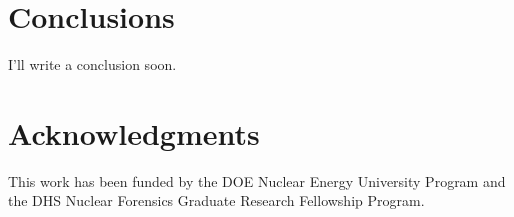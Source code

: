 \documentclass{anstrans}
\begin{document}
\section{Conclusions}

I'll write a conclusion soon. 

\section{Acknowledgments}
This work has been funded by the \gls{DOE} Nuclear Energy University Program and the \gls{DHS} Nuclear Forensics Graduate Research Fellowship Program. 



\end{document}
